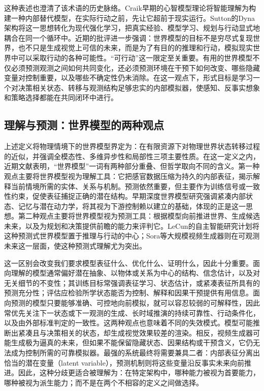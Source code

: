 这种表述也澄清了该术语的历史脉络。Craik早期的心智模型理论将智能理解为构建一种内部替代模型，在实际行动之前，先让它超前于现实运行\citep{craik1943nature}。Sutton的Dyna架构将这一思想转化为现代强化学习，把真实经验、模型学习、规划与行动显式地耦合在同一个循环中\citep{sutton1990dyna,sutton1991dyna}。近期的批评进一步强调：世界模型的目标不是穷尽式复现世界，也不只是生成视觉上可信的未来，而是为了有目的的推理和行动，模拟现实世界中可以采取行动的各种可能性\citep{xing2025critiques}。“可行动”这一限定至关重要。有用的世界模型不仅必须预测观测之间如何共同变化，还必须预测环境在干预下如何改变、哪些隐藏变量对控制重要，以及哪些不确定性仍未消除。在这一观点下，形式目标是学习一个对决策相关状态、转移与观测结构足够忠实的内部模拟器，使感知、反事实想象和策略选择都能在共同闭环中进行。

\subsection{理解与预测：世界模型的两种观点}
上述定义将物理情境下的世界模型界定为：在有限资源下对物理世界状态转移过程的近似，并强调全模态性、多维异步性和局部性三项主要性质。在这一定义之内，近期文献表明，“世界模型”一词有两种部分重叠、但哲学取向不同的含义\citep{ding2024understanding}。第一种观点主要将世界模型视为理解工具：它把感官数据压缩为持久的内部表征，揭示解释当前情境所需的实体、关系与机制。预测依然重要，但主要作为训练信号或一致性约束，促使表征捕捉正确的潜在结构。早期深度世界模型研究强调紧凑内部状态、记忆与潜在动力学，将其视为下游控制赖以建立的基础，体现的正是这一思想\citep{ha2018worldmodelsorig}。第二种观点主要将世界模型视为预测工具：根据模型向前推进世界、生成候选未来，以及为规划和决策提供前瞻的能力来评判它。LeCun的自主智能研究计划将这种预测式世界模型置于推理与行动的中心\citep{dawid2023autonomous}；Sora等大规模视频生成器则在可观测未来这一层面，使这种预测式理解尤为突出\citep{openai2024sora}。

这一区别会改变我们要求模型表征什么、优化什么、证明什么，因此十分重要。面向理解的模型通常偏好潜在抽象、以物体或关系为中心的结构、信念估计，以及对无关细节的不变性；其训练目标常强调表征学习、状态估计，或紧凑表征所具有的预测充分性；评估应检验所学状态能否为控制、解释和因果干预提供有用信息。面向预测的模型只要能够准确、可控地向前模拟，就可以容忍较弱的可解释性，因此常优先关注下一状态或下一观测的生成、长时域推演的持续可靠性、行动条件化，以及由外部标准判定的一致性。这两种观点也意味着不同的失效模式。模型可能推断出紧凑且与决策相关的状态，却生成视觉效果较差的渲染。相反，视频生成器可能生成极为逼真的未来，但如果不能保留隐藏状态、因果结构或干预含义，它仍无法成为控制所需的可靠模拟器\citep{xing2025critiques}。最强的系统最终将需要兼具二者：内部表征分离出恰当的潜在变量（latent variable），预测机制则将这些变量沿反事实未来向前推进。因此，这种分歧更适合被理解为：在特定架构中，哪种能力被视为首要能力，哪种被视为派生能力；而不是在两个不相容的定义之间做选择。

